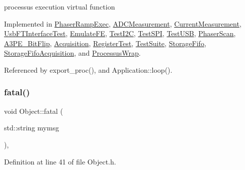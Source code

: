 processus execution virtual function 

Implemented in \hyperlink{classPhaserRampExec_a5fccbd3cddf738318f9d45d64b723907}{Phaser\+Ramp\+Exec}, \hyperlink{classADCMeasurement_a82de69f0488646dfc50d28f611e2010d}{A\+D\+C\+Measurement}, \hyperlink{classCurrentMeasurement_a19ae0dcc63b4151ceebe0bf2c42da948}{Current\+Measurement}, \hyperlink{classUsbFTInterfaceTest_a1e6d0b0e0c1c58238e78c5b910289b68}{Usb\+F\+T\+Interface\+Test}, \hyperlink{classEmulateFE_a5133d5b45521fc311db62d61217848b9}{Emulate\+FE}, \hyperlink{classTestI2C_aafef0778386d8a60aa5fa6067ef7ea00}{Test\+I2C}, \hyperlink{classTestSPI_afe77bfff2e5454c8b3d012721d1f0a99}{Test\+S\+PI}, \hyperlink{classTestUSB_a8c3d68e00ec4f10ec638969756a925a8}{Test\+U\+SB}, \hyperlink{classPhaserScan_abf8e9639bcbbd23ec1a9a8e04319d9d1}{Phaser\+Scan}, \hyperlink{classA3PE__BitFlip_affa7320fb39001a6e9b5696542fe4584}{A3\+P\+E\+\_\+\+Bit\+Flip}, \hyperlink{classAcquisition_ae3b63064bee1b042914b63ae4135cbd8}{Acquisition}, \hyperlink{classRegisterTest_aa1a19b0cd0e0f2d8a47913521ae259a4}{Register\+Test}, \hyperlink{classTestSuite_a531665e9bba1edb96a3ffdd421f642e2}{Test\+Suite}, \hyperlink{classStorageFifo_aa6826007c79ce353640fd1b1836807ff}{Storage\+Fifo}, \hyperlink{classStorageFifoAcquisition_a36ffcd2b9bd7ff721c4d0b638b8e4901}{Storage\+Fifo\+Acquisition}, and \hyperlink{structProcessusWrap_a099df299b3dadd548c44e7e6d94f027a}{Processus\+Wrap}.



Referenced by export\+\_\+proc(), and Application\+::loop().

\mbox{\label{classObject_aad5a16aac7516ce65bd5ec02ab07fc80}} 
\subsubsection{\texorpdfstring{fatal()}{fatal()}\hspace{0.1cm}{\footnotesize\ttfamily [1/2]}}
{\footnotesize\ttfamily void Object\+::fatal (\begin{DoxyParamCaption}\item[{std\+::string}]{mymsg }\end{DoxyParamCaption})\hspace{0.3cm}{\ttfamily [inline]}, {\ttfamily [inherited]}}



Definition at line 41 of file Object.\+h.



